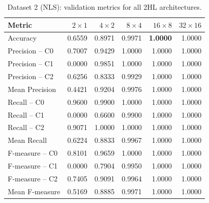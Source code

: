 \documentclass[11pt,a4paper]{article}
\begin{document}
\begin{table}[H]
\centering
\caption{Dataset 2 (NLS): validation metrics for all 2HL architectures.}
\label{tab:nls-val-metrics}
\small
\begin{tabular}{lrrrrr}
\toprule
Metric & $2\times1$ & $4\times2$ & $8\times4$ & $16\times8$ & $32\times16$ \\
\midrule
Accuracy        & 0.6559 & 0.8971 & 0.9971 & \textbf{1.0000} & 1.0000 \\
Precision -- C0 & 0.7007 & 0.9429 & 1.0000 & 1.0000 & 1.0000 \\
Precision -- C1 & 0.0000 & 0.9851 & 1.0000 & 1.0000 & 1.0000 \\
Precision -- C2 & 0.6256 & 0.8333 & 0.9929 & 1.0000 & 1.0000 \\
Mean Precision  & 0.4421 & 0.9204 & 0.9976 & 1.0000 & 1.0000 \\
Recall -- C0    & 0.9600 & 0.9900 & 1.0000 & 1.0000 & 1.0000 \\
Recall -- C1    & 0.0000 & 0.6600 & 0.9900 & 1.0000 & 1.0000 \\
Recall -- C2    & 0.9071 & 1.0000 & 1.0000 & 1.0000 & 1.0000 \\
Mean Recall     & 0.6224 & 0.8833 & 0.9967 & 1.0000 & 1.0000 \\
F-measure -- C0 & 0.8101 & 0.9659 & 1.0000 & 1.0000 & 1.0000 \\
F-measure -- C1 & 0.0000 & 0.7904 & 0.9950 & 1.0000 & 1.0000 \\
F-measure -- C2 & 0.7405 & 0.9091 & 0.9964 & 1.0000 & 1.0000 \\
Mean F-measure  & 0.5169 & 0.8885 & 0.9971 & 1.0000 & 1.0000 \\
\bottomrule
\end{tabular}
\end{table}
\end{document}
